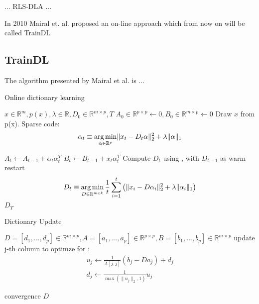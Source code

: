 ... RLS-DLA \cite{Engan2010} ...


In 2010 Mairal et. al. \cite{Mairal2010} proposed an on-line approach which from now on will be called TrainDL

\subsection{TrainDL}
\label{sec:mairal}
The algorithm presented by Mairal et al. \cite{Mairal2010} is ...

\begin{algorithm}
\caption{Online dictionary learning \cite{Mairal2010}}
\begin{algorithmic}[1]
\REQUIRE $x \in \mathbb{R}^m,  p \left( x \right), \lambda \in \mathbb{R}, D_0 \in \mathbb{R}^{m \times p}, T$
\STATE $A_0 \in \mathbb{R}^{p \times p} \gets  0, B_0 \in \mathbb{R}^{m \times p}\gets 0$
\STATE Draw $x$ from p(x).
\STATE Sparse code:
\begin{align} 
\alpha_t \equiv \operatorname*{arg\,min}_{\alpha\in\mathbb{R}^{p}}  \lVert x_t - D_t\alpha \rVert^{2}_{2}  +  \lambda \lVert \alpha \rVert_{1}
\end{align}

\STATE $A_t \gets A_{t-1} + \alpha_t\alpha_t^T$
\STATE $B_t \gets B_{t-1} + x_t\alpha_t^T$
\STATE Compute $D_t$ using , with $D_{t-1}$ as warm restart 
\begin{align} 
D_t \equiv \operatorname*{arg\,min}_{D \in \mathbb{R}^{m x k}}  \frac{1}{t} \sum_{i=1}^t \left( \lVert x_i - D\alpha_i \rVert^{2}_{2}  +  \lambda \lVert \alpha_i \rVert_{1} \right) \label{eq:update}
\end{align}
\ENDFOR
\RETURN $D_T$
\end{algorithmic}
\end{algorithm}


\begin{algorithm}
\caption{Dictionary Update}
\label{alg:update}
\begin{algorithmic}[1]
\REQUIRE $D=[d_1,...,d_p] \in \mathbb{R}^{m \times p}, A=[a_1,...,a_p] \in \mathbb{R}^{p \times p}, B=[b_1,...,b_p] \in \mathbb{R}^{m \times p}$
\REPEAT
{}
\STATE update j-th column to optimze for :
\begin{align}
u_j \gets \frac{1}{A[j,j]}\left(b_j-Da_j\right)+d_j \\
d_j \gets \frac{1}{\max\left(\lVert u_j \rVert_2,1\right)} u_j
\end{align}

\ENDFOR
\UNTIL convergence 
\RETURN $D$
\end{algorithmic}
\end{algorithm}

